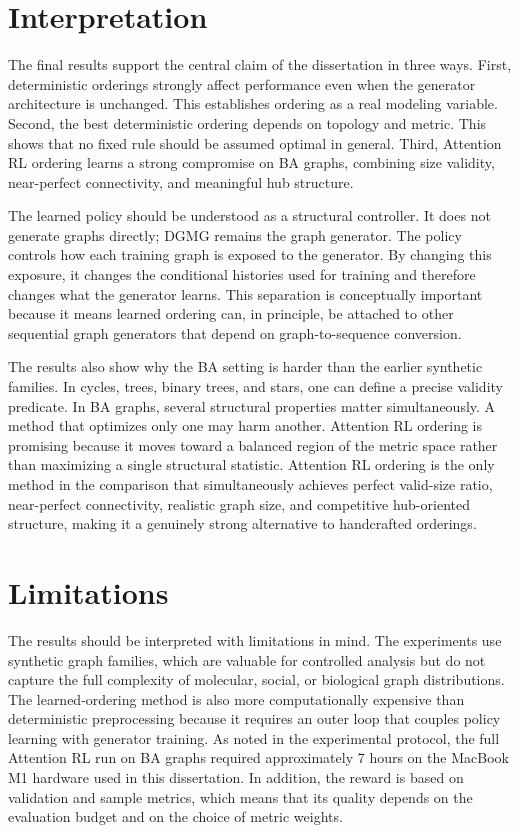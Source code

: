 \section{Interpretation}
\label{sec:results-interpretation}

The final results support the central claim of the dissertation in three ways. First, deterministic orderings strongly affect performance even when the generator architecture is unchanged. This establishes ordering as a real modeling variable. Second, the best deterministic ordering depends on topology and metric. This shows that no fixed rule should be assumed optimal in general. Third, Attention RL ordering learns a strong compromise on BA graphs, combining size validity, near-perfect connectivity, and meaningful hub structure.

The learned policy should be understood as a structural controller. It does not generate graphs directly; DGMG remains the graph generator. The policy controls how each training graph is exposed to the generator. By changing this exposure, it changes the conditional histories used for training and therefore changes what the generator learns. This separation is conceptually important because it means learned ordering can, in principle, be attached to other sequential graph generators that depend on graph-to-sequence conversion.

The results also show why the BA setting is harder than the earlier synthetic families. In cycles, trees, binary trees, and stars, one can define a precise validity predicate. In BA graphs, several structural properties matter simultaneously. A method that optimizes only one may harm another. Attention RL ordering is promising because it moves toward a balanced region of the metric space rather than maximizing a single structural statistic. Attention RL ordering is the only method in the comparison that simultaneously achieves perfect valid-size ratio, near-perfect connectivity, realistic graph size, and competitive hub-oriented structure, making it a genuinely strong alternative to handcrafted orderings.

\section{Limitations}
\label{sec:results-limitations}

The results should be interpreted with limitations in mind. The experiments use synthetic graph families, which are valuable for controlled analysis but do not capture the full complexity of molecular, social, or biological graph distributions. The learned-ordering method is also more computationally expensive than deterministic preprocessing because it requires an outer loop that couples policy learning with generator training. As noted in the experimental protocol, the full Attention RL run on BA graphs required approximately 7 hours on the MacBook M1 hardware used in this dissertation. In addition, the reward is based on validation and sample metrics, which means that its quality depends on the evaluation budget and on the choice of metric weights.

